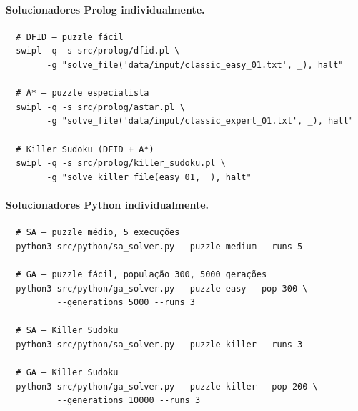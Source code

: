 \paragraph{Solucionadores Prolog individualmente.}
\begin{verbatim}
  # DFID — puzzle fácil
  swipl -q -s src/prolog/dfid.pl \
        -g "solve_file('data/input/classic_easy_01.txt', _), halt"

  # A* — puzzle especialista
  swipl -q -s src/prolog/astar.pl \
        -g "solve_file('data/input/classic_expert_01.txt', _), halt"

  # Killer Sudoku (DFID + A*)
  swipl -q -s src/prolog/killer_sudoku.pl \
        -g "solve_killer_file(easy_01, _), halt"
\end{verbatim}

\paragraph{Solucionadores Python individualmente.}
\begin{verbatim}
  # SA — puzzle médio, 5 execuções
  python3 src/python/sa_solver.py --puzzle medium --runs 5

  # GA — puzzle fácil, população 300, 5000 gerações
  python3 src/python/ga_solver.py --puzzle easy --pop 300 \
          --generations 5000 --runs 3

  # SA — Killer Sudoku
  python3 src/python/sa_solver.py --puzzle killer --runs 3

  # GA — Killer Sudoku
  python3 src/python/ga_solver.py --puzzle killer --pop 200 \
          --generations 10000 --runs 3
\end{verbatim}
